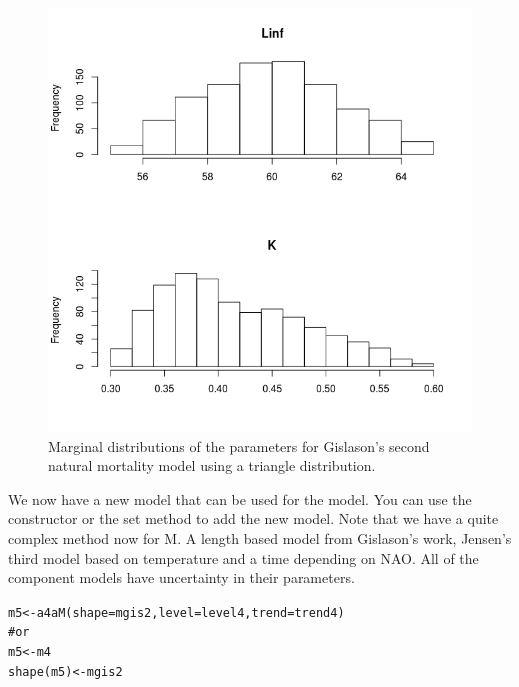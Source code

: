 \documentclass[a4paper,english,10pt]{article}\usepackage[]{graphicx}\usepackage[]{color}
\makeatletter
\newcommand{\hlcom}[1]{\textcolor[rgb]{0.588,0.588,0.588}{#1}}%
\newcommand{\hlstd}[1]{\textcolor[rgb]{0.196,0.196,0.196}{#1}}%
\newcommand{\hlkwb}[1]{\textcolor[rgb]{0.627,0,0.314}{#1}}%
\newcommand{\hlkwc}[1]{\textcolor[rgb]{0,0.631,0.314}{#1}}%
\newcommand{\hlkwd}[1]{\textcolor[rgb]{0.78,0.227,0.412}{#1}}%
\newenvironment{kframe}{%
 \def\at@end@of@kframe{}%
 \ifinner\ifhmode%
  \def\at@end@of@kframe{\end{minipage}}%
  \begin{minipage}{\columnwidth}%
 \fi\fi%
 \def\FrameCommand##1{\hskip\@totalleftmargin \hskip-\fboxsep
 \colorbox{shadecolor}{##1}\hskip-\fboxsep
     \hskip-\linewidth \hskip-\@totalleftmargin \hskip\columnwidth}%
 \MakeFramed {\advance\hsize-\width
   \@totalleftmargin\z@ \linewidth\hsize
   \@setminipage}}%
 {\par\unskip\endMakeFramed%
 \at@end@of@kframe}
\newenvironment{knitrout}{}{} %
\makeatother
\begin{document}
\begin{knitrout}
\color{fgcolor}\begin{figure}[H]

{\centering \includegraphics[width=.9\linewidth]{figure/plot_tri_gis_m_hist-1} 

}

\caption[Marginal distributions of the parameters for Gislason's second natural mortality model using a triangle distribution]{Marginal distributions of the parameters for Gislason's second natural mortality model using a triangle distribution.}\label{fig:plot_tri_gis_m_hist}
\end{figure}


\end{knitrout}

We now have a new model that can be used for the  model. You can use the constructor or the set method to add the new model. Note that we have a quite complex method now for M. A length based  model from Gislason's work, Jensen's third model based on temperature  and a time  depending on NAO. All of the component models have uncertainty in their parameters.

\begin{knitrout}
\color{fgcolor}\begin{kframe}
\begin{alltt}
\hlstd{m5} \hlkwb{<-} \hlkwd{a4aM}\hlstd{(}\hlkwc{shape} \hlstd{= mgis2,} \hlkwc{level} \hlstd{= level4,} \hlkwc{trend} \hlstd{= trend4)}
\hlcom{# or}
\hlstd{m5} \hlkwb{<-} \hlstd{m4}
\hlkwd{shape}\hlstd{(m5)} \hlkwb{<-} \hlstd{mgis2}
\end{alltt}
\end{kframe}
\end{knitrout}
\end{document}

